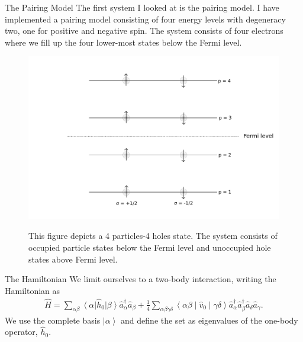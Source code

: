 \documentclass[twoside,english]{uiofysmaster}
\begin{document}
\begin{chapter}{The Pairing Model}
	The first system I looked at is the pairing model. I have
        implemented a pairing model consisting of four energy levels
        with degeneracy two, one for positive and negative spin. The
        system consists of four electrons where we fill up the four
        lower-most states below the Fermi level.
	\begin{figure}[h]
		\includegraphics[width=\textwidth]{Figures/Pairing_model.pdf}
		\label{PairingModel_1}
		\caption{This figure depicts a 4 particles-4 holes state. The system consists of occupied particle states below the Fermi level and unoccupied hole states above Fermi level.}
	\end{figure}
	
	\begin{section}{The Hamiltonian}
		We limit ourselves to a two-body interaction, writing the Hamiltonian as
		\begin{align}
			\hat H = \sum_{\alpha \beta} \left< \alpha \right| \hat h_0 \left| \beta \right> \hat a_{\alpha}^{\dagger} \hat a_{\beta} 
			        + \frac{1}{4} \sum_{\alpha \beta \gamma \delta} \left< \alpha \beta \middle| \hat v_0 \middle| \gamma \delta \right> \hat a_{\alpha}^{\dagger} \hat a_{\beta}^{\dagger} \hat a_{\delta} \hat a_{\gamma}.
		\end{align}
		We use the complete basis $\left| \alpha \right>$ and define the set as eigenvalues of the one-body operator, $\hat h_0$. 
		

\end{section}
\end{chapter}
\end{document}
